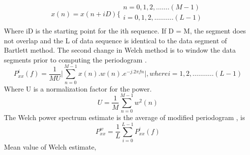 \begin{equation}\tag{6.22}
x ( n ) =x ( n+iD )  \{ \begin{array}{ll}
	n=0,1,2, \ldots  \ldots . ( M-1 ) \\
	i=0,1,2, \ldots  \ldots  \ldots . ( L-1 ) \\
	\end{array}
\end{equation}
Where iD is the starting point for the ith sequence. If D = M, the segment does not overlap and the L of data sequence is identical to the data segment of Bartlett method. The second change in Welch method is to window the data segments prior to computing the periodogram \cite{liu2018survey}.
\begin{equation}\tag{6.23}
P_{xx}^{i} ( f ) =\frac{1}{MU} \vert  \sum _{n=0}^{M-1}x ( n ) .w ( n ) .e^{-j.2 \pi fn} \vert , where i=1,2, \ldots  \ldots  \ldots .. ( L-1 )
\end{equation}
Where U is a normalization factor for the power.
\begin{equation}\tag{6.24}
U=\frac{1}{M} \sum _{n=0}^{M-1}w^{2} ( n )
\end{equation}
The Welch power spectrum estimate is the average of modified periodogram \cite{cheikhrouhou2018hybrid}, is
\begin{equation}\tag{6.25}
P_{xx}^{w}=\frac{1}{L} \sum _{i=0}^{L-1}P_{xx}^{i} ( f )
\end{equation}
Mean value of Welch estimate,

